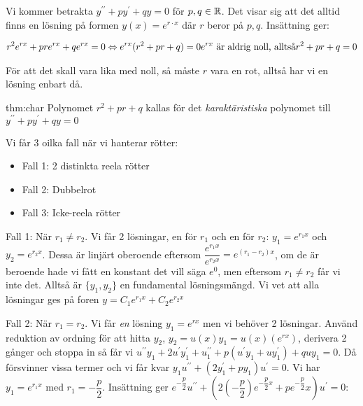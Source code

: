 \noindent Vi kommer betrakta $y^{\prime\prime}+py^{\prime}+qy=0$ för $p, q \in\mathbb{R}$. Det visar sig att det alltid finns en lösning på formen $y(x)=e^{r\cdot x}$ där $r$ beror på $p, q$. Insättning ger:


\begin{equation*}
  \begin{gathered}
    r^2e^{rx}+pre^{rx}+qe^{rx}=0 \Leftrightarrow e^{rx}(r^2+pr+q)=0
    \text{$e^{rx}$ är aldrig noll, alltså} r^2+pr+q=0
  \end{gathered}
\end{equation*}
\par\bigskip
\noindent För att det skall vara lika med noll, så måste $r$ vara en rot, alltså har vi en lösning enbart då.
\par\bigskip

\begin{theo}{thm:char}
  Polynomet $r^2+pr+q$ kallas för det \textit{karaktäristiska} polynomet till $y^{\prime\prime}+py^{\prime}+qy=0$
\end{theo}
\par\bigskip

\noindent Vi får 3 oilka fall när vi hanterar rötter:

\begin{itemize}
  \item Fall 1: 2 distinkta reela rötter
  \item Fall 2: Dubbelrot
  \item Fall 3: Icke-reela rötter
\end{itemize}
\par\bigskip

\noindent Fall 1: När $r_1\neq r_2$. Vi får 2 lösningar, en för $r_1$ och en för $r_2$: $y_1=e^{r_1x}$ och $y_2=e^{r_2x}$. Dessa är linjärt oberoende eftersom $\dfrac{e^{r_1x}}{e^{r_2x}}=e^{(r_1-r_2)x}$, om de är beroende hade vi fått en konstant det vill säga $e^0$, men eftersom $r_1\neq r_2$ får vi inte det. Alltså är $\{y_1, y_2\}$ en fundamental lösningsmängd. Vi vet att alla lösningar ges på foren $y=C_1e^{r_1x}+C_2e^{r_2x}$
\par\bigskip

\noindent Fall 2: När $r_1=r_2$. Vi får \textit{en} lösning $y_1=e^{rx}$ men vi behöver 2 lösningar. Använd reduktion av ordning för att hitta $y_2$, $y_2 = u(x)y_1 = u(x)(e^{rx})$, derivera 2 gånger och stoppa in så får vi $u^{\prime\prime}y_1+2u^{\prime}y_{1}^{\prime}+u_{1}^{\prime\prime}+p(u^{\prime}y_1+uy_{1}^{\prime})+quy_1=0$. Då försvinner vissa termer och vi får kvar $y_1u^{\prime\prime}+(2y_{1}^{\prime}+py_{1})u^{\prime}=0$. Vi har $y_1=e^{r_1x}$ med $r_1=-\dfrac{p}{2}$. Insättning ger $e^{-\dfrac{p}{2}}u^{\prime\prime}+(2(-\dfrac{p}{2})e^{-\dfrac{p}{2}x}+pe^{-\dfrac{p}{2}}x)u^{\prime}=0$:


